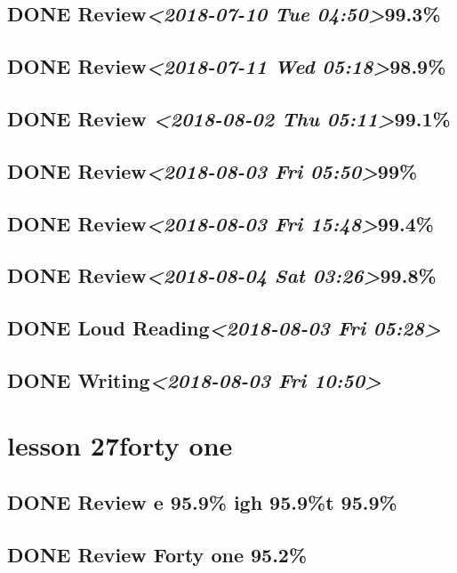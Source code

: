 \documentclass[11pt]{ctexart}
\begin{document}
\subsection{{\bfseries\sffamily DONE} Review\textit{<2018-07-10 Tue 04:50>}99.3\%}
\label{sec:orgc9bcae3}
\subsection{{\bfseries\sffamily DONE} Review\textit{<2018-07-11 Wed 05:18>}98.9\%}
\label{sec:orgd8e828c}
\subsection{{\bfseries\sffamily DONE} Review \textit{<2018-08-02 Thu 05:11>}99.1\%}
\label{sec:orgf9f9c95}
\subsection{{\bfseries\sffamily DONE} Review\textit{<2018-08-03 Fri 05:50>}99\%}
\label{sec:org6a24b8a}
\subsection{{\bfseries\sffamily DONE} Review\textit{<2018-08-03 Fri 15:48>}99.4\%}
\label{sec:orge8c1e12}
\subsection{{\bfseries\sffamily DONE} Review\textit{<2018-08-04 Sat 03:26>}99.8\%}
\label{sec:org76e23d2}
\subsection{{\bfseries\sffamily DONE} Loud Reading\textit{<2018-08-03 Fri 05:28>}}
\label{sec:org6c2f693}
\subsection{{\bfseries\sffamily DONE} Writing\textit{<2018-08-03 Fri 10:50>}}
\label{sec:orgbc0e942}
\section{lesson 27forty one}
\label{sec:org0900e6a}
\subsection{{\bfseries\sffamily DONE} Review e 95.9\% igh 95.9\%t 95.9\%}
\label{sec:org53a6d25}
\subsection{{\bfseries\sffamily DONE} Review Forty one 95.2\%}
\label{sec:orgbe883e3}
\end{document}
